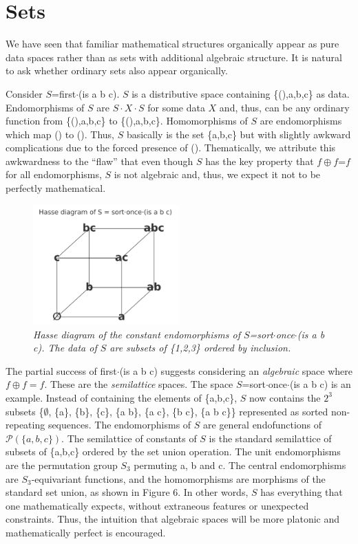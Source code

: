 \documentclass[11pt]{article}
\begin{document}
\section{Sets}

    We have seen that familiar mathematical structures organically appear as pure data spaces rather than as sets with additional algebraic structure.  
It is natural to ask whether ordinary sets also appear organically.  

     Consider $S$=first$\cdot$(is a b c).  $S$ is a distributive space containing \{(),a,b,c\} as data.  Endomorphisms of $S$ are  
$S\cdot X\cdot S$ for some data $X$ and, thus, can be any ordinary function from \{(),a,b,c\} to \{(),a,b,c\}.  Homomorphisms of $S$ 
are endomorphisms which map () to ().  Thus, $S$ basically is the set \{a,b,c\} but with slightly awkward complications due 
to the forced presence of ().  Thematically, we attribute this awkwardness to the ``flaw'' that even though $S$ has the key property 
that $f\oplus f$=$f$ for all endomorphisms, $S$ is not algebraic and, thus, we expect it not to be perfectly mathematical.  

\begin{figure}[h]
\centering
\includegraphics[width=0.5\textwidth]{hasse.png}
\caption{{\it Hasse diagram of the constant endomorphisms of $S$=sort$\cdot$once$\cdot$(is a b c).  The data of $S$ are subsets 
of \{1,2,3\} ordered by inclusion.}}
\end{figure}

     The partial success of first$\cdot$(is a b c) suggests considering an {\it algebraic} space where $f\oplus f=f$.  
These are the {\it semilattice} spaces.  The space $S$=sort$\cdot$once$\cdot$(is a b c) is an example.  
Instead of containing the elements of \{a,b,c\}, $S$ now contains the $2^3$ subsets \{$\emptyset$, \{a\}, \{b\}, \{c\}, \{a b\}, \{a c\}, \{b c\}, \{a b c\}\} 
represented as sorted non-repeating sequences.  The endomorphisms of $S$ are general endofunctions of ${\mathcal P}(\{a,b,c\})$.  The semilattice of 
constants of $S$ is the standard semilattice of subsets of \{a,b,c\} ordered by the set union operation.  
The unit endomorphisms are the permutation group $S_3$ permuting a, b and c.  The central endomorphisms are $S_3$-equivariant functions, and the homomorphisms 
are morphisms of the standard set union, as shown in Figure 6.  In other words, $S$ has everything that one mathematically expects, without extraneous features or 
unexpected constraints.  Thus, the intuition that algebraic spaces will be more platonic and mathematically perfect is encouraged.  
\end{document}
